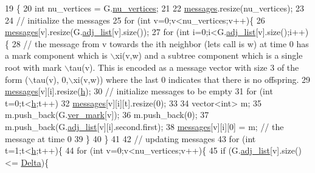 \begin{DoxyCode}
19 \{
20   \textcolor{keywordtype}{int} nu\_vertices = G.\hyperlink{classmarked__graph_acf79c6aeb8f32614cb14a5baaa6c9f9b}{nu\_vertices};
21 
22   \hyperlink{classgraph__message_a06a1d1ab91b4891c65ea80205566f800}{messages}.resize(nu\_vertices);
23 
24   \textcolor{comment}{// initialize the messages}
25   \textcolor{keywordflow}{for} (\textcolor{keywordtype}{int} v=0;v<nu\_vertices;v++)\{
26     \hyperlink{classgraph__message_a06a1d1ab91b4891c65ea80205566f800}{messages}[v].resize(G.\hyperlink{classmarked__graph_a1a0bf7ca413a278763f7c878b3b6fd6f}{adj\_list}[v].size());
27     \textcolor{keywordflow}{for} (\textcolor{keywordtype}{int} i=0;i<G.\hyperlink{classmarked__graph_a1a0bf7ca413a278763f7c878b3b6fd6f}{adj\_list}[v].size();i++)\{
28       \textcolor{comment}{// the message from v towards the ith neighbor (lets call is w) at time 0 has a mark component which
       is \(\backslash\)xi(v,w) and a subtree component which is a single root with mark \(\backslash\)tau(v). This is encoded as a message
       vector with size 3 of the form (\(\backslash\)tau(v), 0,\(\backslash\)xi(v,w)) where the last 0 indicates that there is no offspring.}
29       \hyperlink{classgraph__message_a06a1d1ab91b4891c65ea80205566f800}{messages}[v][i].resize(\hyperlink{classgraph__message_a934d63ed7275c211e13c6fb68824ed46}{h});
30       \textcolor{comment}{// initialize messages to be empty}
31       \textcolor{keywordflow}{for} (\textcolor{keywordtype}{int} t=0;t<\hyperlink{classgraph__message_a934d63ed7275c211e13c6fb68824ed46}{h};t++)
32         \hyperlink{classgraph__message_a06a1d1ab91b4891c65ea80205566f800}{messages}[v][i][t].resize(0);
33 
34       vector<int> m;
35       m.push\_back(G.\hyperlink{classmarked__graph_ac83e9377dd4d8bb95be1ac949b127296}{ver\_mark}[v]);
36       m.push\_back(0);
37       m.push\_back(G.\hyperlink{classmarked__graph_a1a0bf7ca413a278763f7c878b3b6fd6f}{adj\_list}[v][i].second.first);
38       \hyperlink{classgraph__message_a06a1d1ab91b4891c65ea80205566f800}{messages}[v][i][0] = m; \textcolor{comment}{// the message at time 0}
39     \}
40   \}
41 
42   \textcolor{comment}{// updating messages}
43   \textcolor{keywordflow}{for} (\textcolor{keywordtype}{int} t=1;t<\hyperlink{classgraph__message_a934d63ed7275c211e13c6fb68824ed46}{h};t++)\{
44     \textcolor{keywordflow}{for} (\textcolor{keywordtype}{int} v=0;v<nu\_vertices;v++)\{
45       \textcolor{keywordflow}{if} (G.\hyperlink{classmarked__graph_a1a0bf7ca413a278763f7c878b3b6fd6f}{adj\_list}[v].size() <= \hyperlink{classgraph__message_a45dfd061b7bc73572e5132fbf66efd55}{Delta})\{

\end{DoxyCode}
